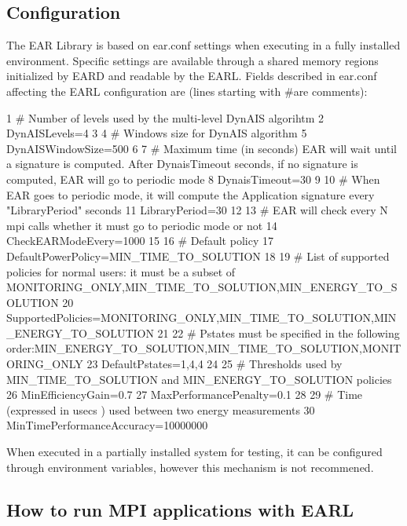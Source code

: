 \subsection*{Configuration }

The E\+AR Library is based on ear.\+conf settings when executing in a fully installed environment. Specific settings are available through a shared memory regions initialized by E\+A\+RD and readable by the E\+A\+RL. Fields described in ear.\+conf affecting the E\+A\+RL configuration are (lines starting with \#are comments)\+:


\begin{DoxyCode}
1 # Number of levels used by the multi-level DynAIS algorihtm
2 DynAISLevels=4
3 
4 # Windows size for DynAIS algorithm
5 DynAISWindowSize=500
6 
7 # Maximum time (in seconds) EAR will wait until a signature is computed. After DynaisTimeout seconds, if no
       signature is computed, EAR will go to periodic mode
8 DynaisTimeout=30
9 
10 # When EAR goes to periodic mode, it will compute the Application signature every "LibraryPeriod" seconds
11 LibraryPeriod=30
12 
13 # EAR will check every N mpi calls whether it must go to periodic mode or not
14 CheckEARModeEvery=1000
15 
16 # Default policy
17 DefaultPowerPolicy=MIN\_TIME\_TO\_SOLUTION
18 
19 # List of supported policies for normal users: it must be a subset of
       MONITORING\_ONLY,MIN\_TIME\_TO\_SOLUTION,MIN\_ENERGY\_TO\_SOLUTION
20 SupportedPolicies=MONITORING\_ONLY,MIN\_TIME\_TO\_SOLUTION,MIN\_ENERGY\_TO\_SOLUTION
21 
22 # Pstates must be specified in the following
       order:MIN\_ENERGY\_TO\_SOLUTION,MIN\_TIME\_TO\_SOLUTION,MONITORING\_ONLY 
23 DefaultPstates=1,4,4
24 
25 # Thresholds used by MIN\_TIME\_TO\_SOLUTION and MIN\_ENERGY\_TO\_SOLUTION policies
26 MinEfficiencyGain=0.7
27 MaxPerformancePenalty=0.1
28 
29 # Time (expressed in usecs ) used between two energy measurements 
30 MinTimePerformanceAccuracy=10000000
\end{DoxyCode}



\begin{DoxyItemize}
\item When executed in a partially installed system for testing, it can be configured through environment variables, however this mechanism is not recommened.
\end{DoxyItemize}

\subsection*{How to run M\+PI applications with E\+A\+RL }

